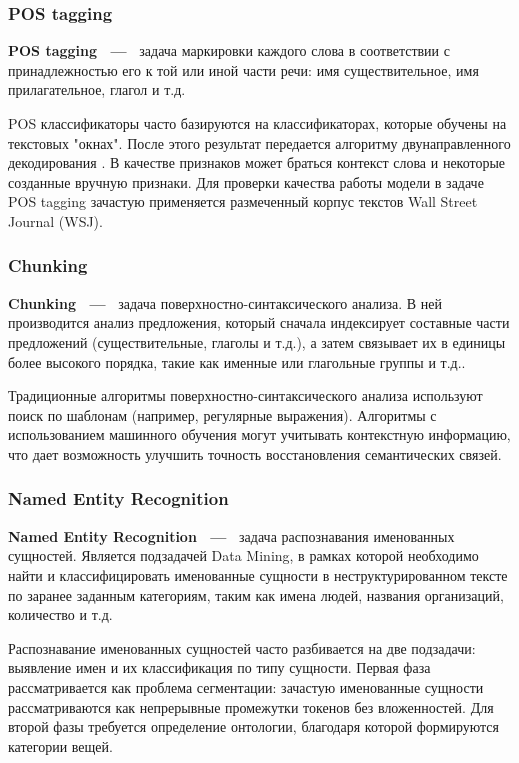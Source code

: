 \subsubsection{POS tagging}
\textbf{POS tagging ~---~} задача маркировки каждого слова в соответствии с принадлежностью его к той или иной части речи: имя существительное, имя прилагательное, глагол и т.д.

POS классификаторы часто базируются на классификаторах, которые обучены на текстовых "окнах". После этого результат передается алгоритму двунаправленного декодирования \autocite{watanabe-sumita-2002-bidirectional}. В качестве признаков может браться контекст слова и некоторые созданные вручную признаки.
Для проверки качества работы модели в задаче POS tagging зачастую применяется размеченный корпус текстов Wall Street Journal (WSJ).
\subsubsection{Chunking}
\textbf{Chunking  ~---~} задача поверхностно-синтаксического анализа. В  ней производится анализ предложения, который сначала индексирует составные части предложений (существительные, глаголы и т.д.), а затем связывает их в единицы более высокого порядка, такие как именные или глагольные группы и т.д.. 

Традиционные алгоритмы поверхностно-синтаксического анализа используют поиск по шаблонам (например, регулярные выражения). Алгоритмы с использованием машинного обучения могут учитывать контекстную информацию, что дает возможность улучшить точность восстановления семантических связей.
\subsubsection{Named Entity Recognition}
\textbf{Named Entity Recognition  ~---~} задача распознавания именованных сущностей. 
Является подзадачей Data Mining, в рамках которой необходимо найти и классифицировать именованные сущности в неструктурированном тексте по заранее заданным категориям, таким как имена людей, названия организаций, количество и т.д.

Распознавание именованных сущностей часто разбивается на две подзадачи: выявление имен и их классификация по типу сущности. Первая фаза рассматривается как проблема сегментации: зачастую именованные сущности рассматриваются как непрерывные промежутки токенов без вложенностей. Для второй фазы требуется определение онтологии, благодаря которой формируются категории вещей.

